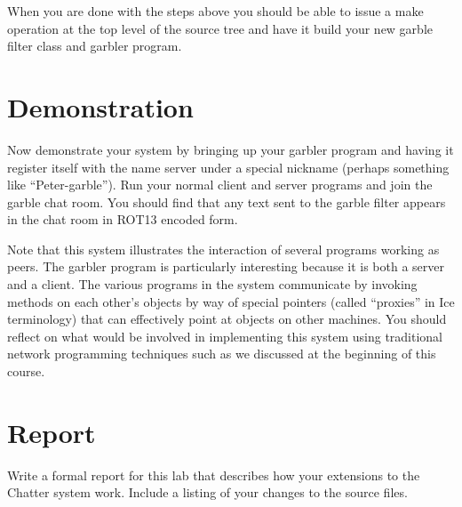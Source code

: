 \documentclass[twocolumn]{article}
\begin{document}
When you are done with the steps above you should be able to issue a make operation at the top
level of the source tree and have it build your new garble filter class and garbler program.

\section{Demonstration}

Now demonstrate your system by bringing up your garbler program and having it register itself
with the name server under a special nickname (perhaps something like ``Peter-garble''). Run
your normal client and server programs and join the garble chat room. You should find that any
text sent to the garble filter appears in the chat room in ROT13 encoded form.

Note that this system illustrates the interaction of several programs working as peers. The
garbler program is particularly interesting because it is both a server and a client. The
various programs in the system communicate by invoking methods on each other's objects by way of
special pointers (called ``proxies'' in Ice terminology) that can effectively point at objects
on other machines. You should reflect on what would be involved in implementing this system
using traditional network programming techniques such as we discussed at the beginning of this
course.

\section{Report}

Write a formal report for this lab that describes how your extensions to the Chatter system
work. Include a listing of your changes to the source files.
\end{document}
